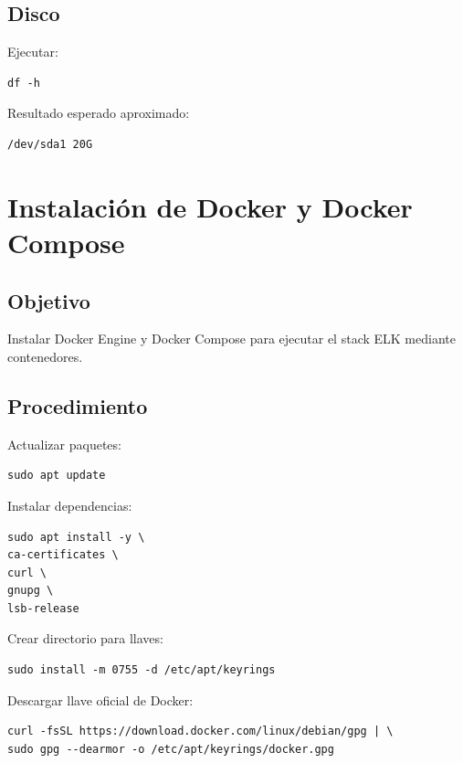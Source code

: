 \documentclass[
  coursetitle={Cómputo Nube y Tecnologías Emergentes},
  coursehours={96},
  coursedate={Verano 2026},
  doctype={Práctica},
  otherlangs={english,french},
  authorname={Lázaro},
  authorsurname={Bustio-Martínez},
  authortitle={PhD},
  role={Profesor Investigador},
  email={lbustio@inaoe.mx},
  phone={5559504000},
  ext={7459},
  institution={Instituto Nacional de Astrofísica, Óptica y Electrónica (INAOE)},
  department={Maestría en Ciencias en Tecnologías de Seguridad},
  address={Luis Enrique Erro 1, Sta. Ma. Tonantzintla, San Andrés Cholula, CP 72840, Puebla, México},
  margin={0.5in}
]{../../lbustio_lecture_notes}
\begin{document}
\subsection{Disco}

Ejecutar:

\begin{lstlisting}
df -h
\end{lstlisting}

Resultado esperado aproximado:

\begin{verbatim}
/dev/sda1 20G
\end{verbatim}

\section{Instalación de Docker y Docker Compose}

\subsection{Objetivo}

Instalar Docker Engine y Docker Compose para ejecutar el stack ELK mediante contenedores.

\subsection{Procedimiento}

Actualizar paquetes:

\begin{lstlisting}
sudo apt update
\end{lstlisting}

Instalar dependencias:

\begin{lstlisting}
sudo apt install -y \
ca-certificates \
curl \
gnupg \
lsb-release
\end{lstlisting}

Crear directorio para llaves:

\begin{lstlisting}
sudo install -m 0755 -d /etc/apt/keyrings
\end{lstlisting}

Descargar llave oficial de Docker:

\begin{lstlisting}
curl -fsSL https://download.docker.com/linux/debian/gpg | \
sudo gpg --dearmor -o /etc/apt/keyrings/docker.gpg
\end{lstlisting}
\end{document}
